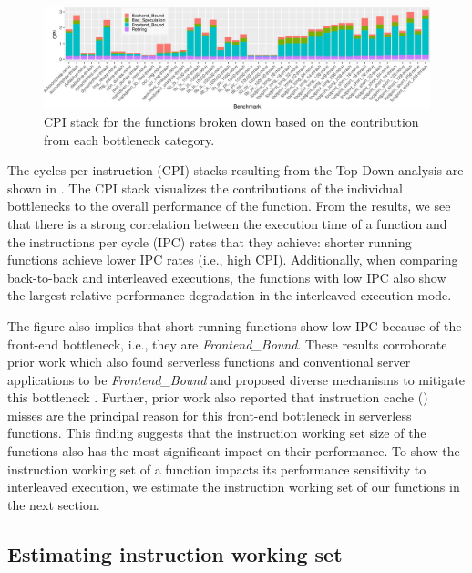 \begin{figure}
  \centering
  \includegraphics[width=\textwidth]{figures/topdown_level1.pdf}
  \caption{\label{wosc:fig:topdown_level1} CPI stack for the functions broken down based on the contribution from each bottleneck category.}
\end{figure}

The cycles per instruction (CPI) stacks resulting from the Top-Down analysis are shown in . The CPI stack visualizes the contributions of the individual bottlenecks to the overall performance of the function. From the results, we see that there is a strong correlation between the execution time of a function and the instructions per cycle (IPC) rates that they achieve: shorter running functions achieve lower IPC rates (i.e., high CPI). Additionally, when comparing back-to-back and interleaved executions, the functions with low IPC also show the largest relative performance degradation in the interleaved execution mode.

The figure also implies that short running functions show low IPC because of the front-end bottleneck, i.e., they are \emph{Frontend\_Bound}. These results corroborate prior work which also found serverless functions and conventional server applications to be \emph{Frontend\_Bound} and proposed diverse mechanisms to mitigate this bottleneck \cite{btbx-pact, btbx-cal, twig, shotgun, boomerang, lukewarm_serverless}. Further, prior work \cite{lukewarm_serverless} also reported that instruction cache () misses are the principal reason for this front-end bottleneck in serverless functions. This finding suggests that the instruction working set size of the functions also has the most significant impact on their performance. To show the instruction working set of a function impacts its performance sensitivity to interleaved execution, we estimate the instruction working set of our functions in the next section.


\subsection{Estimating instruction working set}

